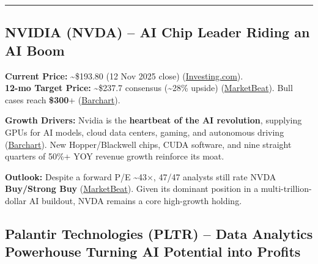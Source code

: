 \documentclass[
]{article}
\begin{document}
\begin{center}\rule{0.5\linewidth}{0.5pt}\end{center}

\hypertarget{nvidia-nvda-ai-chip-leader-riding-an-ai-boom}{%
\subsection{NVIDIA (NVDA) -- AI Chip Leader Riding an AI
Boom}\label{nvidia-nvda-ai-chip-leader-riding-an-ai-boom}}

\textbf{Current Price:} \textasciitilde\$193.80 (12 Nov 2025 close)
(\href{https://www.investing.com/equities/nvidia-corp-historical-data\#:~:text=Nov\%2012\%2C\%202025\%20193,04}{Investing.com}).\\
\textbf{12-mo Target Price:} \textasciitilde\$237.7 consensus
(\textasciitilde28\% upside)
(\href{https://www.marketbeat.com/stocks/NASDAQ/NVDA/forecast/\#:~:text=Consensus\%20Price\%20Target}{MarketBeat}).
Bull cases reach \textbf{\$300}+
(\href{https://www.barchart.com/story/news/35608693/can-nvidia-stock-hit-300-in-2025\#:~:text=Wall\%20Street\%20isn’t\%20done\%20betting,before\%20the\%20year\%20wraps\%20up}{Barchart}).

\textbf{Growth Drivers:} Nvidia is the \textbf{heartbeat of the AI
revolution}, supplying GPUs for AI models, cloud data centers, gaming,
and autonomous driving
(\href{https://www.barchart.com/story/news/35608693/can-nvidia-stock-hit-300-in-2025\#:~:text=When\%20it\%20comes\%20to\%20artificial,The\%20numbers\%20speak\%20for\%20themselves}{Barchart}).
New Hopper/Blackwell chips, CUDA software, and nine straight quarters of
50\%+ YOY revenue growth reinforce its moat.

\textbf{Outlook:} Despite a forward P/E \textasciitilde43×, 47/47
analysts still rate NVDA \textbf{Buy/Strong Buy}
(\href{https://www.marketbeat.com/stocks/NASDAQ/NVDA/forecast/\#:~:text=Based\%20on\%2047\%20Wall\%20Street,strong\%20buy\%20rating\%20for\%20NVDA}{MarketBeat}).
Given its dominant position in a multi-trillion-dollar AI buildout, NVDA
remains a core high-growth holding.

\hypertarget{palantir-technologies-pltr-data-analytics-powerhouse-turning-ai-potential-into-profits}{%
\subsection{Palantir Technologies (PLTR) -- Data Analytics Powerhouse
Turning AI Potential into
Profits}\label{palantir-technologies-pltr-data-analytics-powerhouse-turning-ai-potential-into-profits}}
\end{document}
